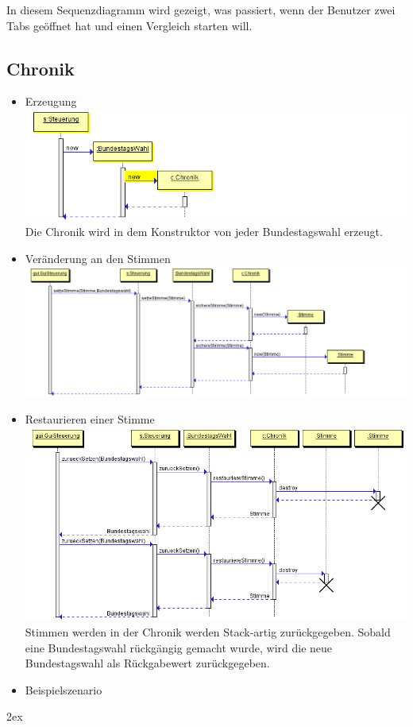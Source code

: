 \documentclass[10pt,a4paper]{article}
\begin{document}
In diesem Sequenzdiagramm wird gezeigt, was passiert, wenn der Benutzer zwei Tabs geöffnet hat und einen Vergleich starten will.

\subsection{Chronik}
\begin{itemize}
	\item Erzeugung \\
		\includegraphics[scale=0.75]{Chronik_Sequenzdiagramm-erzeugen.png}
		\\
		Die Chronik wird in dem Konstruktor von jeder Bundestagswahl erzeugt.
	
	\item Veränderung an den Stimmen \\
		\includegraphics[scale=0.5]{Chronik_Sequenzdiagramm-stimmenaendern.png}
	\item Restaurieren einer Stimme \\
		\includegraphics[scale=0.6]{Chronik_Sequenzdiagramm-restaurieren.png}
		\\
		Stimmen werden in der Chronik werden Stack-artig zurückgegeben. Sobald eine Bundestagswahl rückgängig gemacht wurde, wird die neue Bundestagswahl als Rückgabewert zurückgegeben.
	\item Beispielszenario	
\end{itemize}

\begingroup
\parindent 0pt
\parskip 2ex
\def\enotesize{\normalsize}

\endgroup
\end{document}
